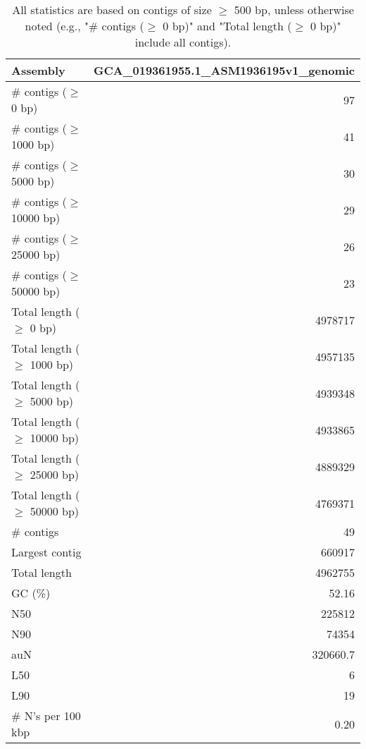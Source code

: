 \documentclass[12pt,a4paper]{article}
\begin{document}
\begin{table}[ht]
\begin{center}
\caption{All statistics are based on contigs of size $\geq$ 500 bp, unless otherwise noted (e.g., "\# contigs ($\geq$ 0 bp)" and "Total length ($\geq$ 0 bp)" include all contigs).}
\begin{tabular}{|l*{1}{|r}|}
\hline
Assembly & GCA\_019361955.1\_ASM1936195v1\_genomic \\ \hline
\# contigs ($\geq$ 0 bp) & 97 \\ \hline
\# contigs ($\geq$ 1000 bp) & 41 \\ \hline
\# contigs ($\geq$ 5000 bp) & 30 \\ \hline
\# contigs ($\geq$ 10000 bp) & 29 \\ \hline
\# contigs ($\geq$ 25000 bp) & 26 \\ \hline
\# contigs ($\geq$ 50000 bp) & 23 \\ \hline
Total length ($\geq$ 0 bp) & 4978717 \\ \hline
Total length ($\geq$ 1000 bp) & 4957135 \\ \hline
Total length ($\geq$ 5000 bp) & 4939348 \\ \hline
Total length ($\geq$ 10000 bp) & 4933865 \\ \hline
Total length ($\geq$ 25000 bp) & 4889329 \\ \hline
Total length ($\geq$ 50000 bp) & 4769371 \\ \hline
\# contigs & 49 \\ \hline
Largest contig & 660917 \\ \hline
Total length & 4962755 \\ \hline
GC (\%) & 52.16 \\ \hline
N50 & 225812 \\ \hline
N90 & 74354 \\ \hline
auN & 320660.7 \\ \hline
L50 & 6 \\ \hline
L90 & 19 \\ \hline
\# N's per 100 kbp & 0.20 \\ \hline
\end{tabular}
\end{center}
\end{table}
\end{document}
